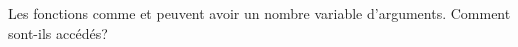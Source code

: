 
Les fonctions comme \printf et \scanf peuvent avoir un nombre variable d'arguments.
Comment sont-ils accédés?







